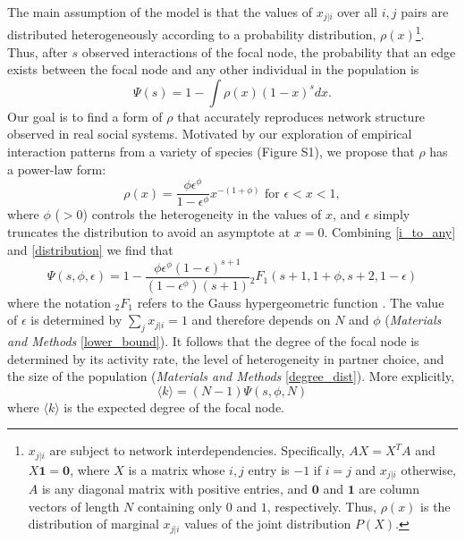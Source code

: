 \documentclass[twocolumn,8pt]{article}
\begin{document}
The main assumption of the model is that the values of $x_{j|i}$ over all $i,j$ pairs are distributed heterogeneously according to a probability distribution, $\rho(x)$\footnote{\scriptsize \sffamily $x_{j|i}$ are subject to network interdependencies. Specifically, $AX=X^{T}A$ and $X\textbf{1}=\textbf{0}$, where $X$ is a matrix whose $i,j$ entry is $-1$ if $i=j$ and $x_{j|i}$ otherwise, $A$ is any diagonal matrix with positive entries, and $\textbf{0}$ and $\textbf{1}$ are column vectors of length $N$ containing only $0$ and $1$, respectively. Thus, $\rho(x)$ is the distribution of marginal $x_{j|i}$ values of the joint distribution $P(X)$.}. Thus, after $s$ observed interactions of the focal node, the probability that an edge exists between the focal node and any other individual in the population is  
\begin{equation}
\label{i_to_any}
\Psi(s)=1-\int\rho(x)(1-x)^{s}dx.
\end{equation}
Our goal is to find a form of $\rho$ that accurately reproduces network structure observed in real social systems. Motivated by our exploration of empirical interaction patterns from a variety of species (Figure S1), we propose that $\rho$ has a power-law form:
\begin{equation}
\label{distribution}
\rho(x)=\frac{\phi\epsilon^{\phi}}{1-\epsilon^{\phi}}x^{-(1+\phi)} \text{ for } \epsilon<x<1,
\end{equation}
where $\phi$ ($>0$) controls the heterogeneity in the values of $x$, and $\epsilon$ simply truncates the distribution to avoid an asymptote at $x=0$. Combining \eqref{i_to_any} and \eqref{distribution} we find that
\begin{equation}
\label{hyper_solution}
\Psi(s,\phi,\epsilon)=1-\frac{\phi\epsilon^{\phi}(1-\epsilon)^{s+1}}{(1-\epsilon^{\phi})(s+1)}{}_{2}F_{1}(s+1, 1+\phi, s+2, 1-\epsilon)
\end{equation}
where the notation ${}_{2}F_{1}$ refers to the Gauss hypergeometric function \cite{absteg}. The value of $\epsilon$ is determined by $\sum_{j}x_{j|i}=1$ and therefore depends on $N$ and $\phi$ (\emph{Materials and Methods} \ref{lower_bound}). It follows that the degree of the focal node is determined by its activity rate, the level of heterogeneity in partner choice, and the size of the population (\emph{Materials and Methods} \ref{degree_dist}). More explicitly,
\begin{equation}
\label{degree}
\langle k \rangle=(N-1)\Psi(s,\phi,N)
\end{equation}
where $\langle k \rangle$ is the expected degree of the focal node.
\end{document}
